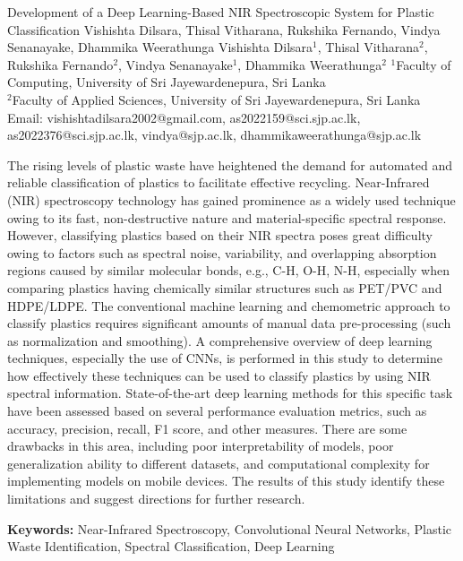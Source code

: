 \paper
{Development of a Deep Learning-Based NIR Spectroscopic System for Plastic Classification}
{Vishishta Dilsara, Thisal Vitharana, Rukshika Fernando, Vindya Senanayake, Dhammika Weerathunga}
{Vishishta Dilsara$^{1}$, Thisal Vitharana$^{2}$, Rukshika Fernando$^{2}$, Vindya Senanayake$^{1}$, Dhammika Weerathunga$^{2}$}
{$^{1}$Faculty of Computing, University of Sri Jayewardenepura, Sri Lanka\\
	$^{2}$Faculty of Applied Sciences, University of Sri Jayewardenepura, Sri Lanka\\
	Email: vishishtadilsara2002@gmail.com, as2022159@sci.sjp.ac.lk, as2022376@sci.sjp.ac.lk, vindya@sjp.ac.lk, dhammikaweerathunga@sjp.ac.lk}
{The rising levels of plastic waste have heightened the demand for automated and reliable classification of plastics to facilitate effective recycling. Near-Infrared (NIR) spectroscopy technology has gained prominence as a widely used technique owing to its fast, non-destructive nature and material-specific spectral response. However, classifying plastics based on their NIR spectra poses great difficulty owing to factors such as spectral noise, variability, and overlapping absorption regions caused by similar molecular bonds, e.g., C-H, O-H, N-H, especially when comparing plastics having chemically similar structures such as PET/PVC and HDPE/LDPE. The conventional machine learning and chemometric approach to classify plastics requires significant amounts of manual data pre-processing (such as normalization and smoothing). A comprehensive overview of deep learning techniques, especially the use of CNNs, is performed in this study to determine how effectively these techniques can be used to classify plastics by using NIR spectral information. State-of-the-art deep learning methods for this specific task have been assessed based on several performance evaluation metrics, such as accuracy, precision, recall, F1 score, and other measures. There are some drawbacks in this area, including poor interpretability of models, poor generalization ability to different datasets, and computational complexity for implementing models on mobile devices. The results of this study identify these limitations and suggest directions for further research.
	
	\textbf{Keywords:} Near-Infrared Spectroscopy, Convolutional Neural Networks, Plastic Waste Identification, Spectral Classification, Deep Learning
}